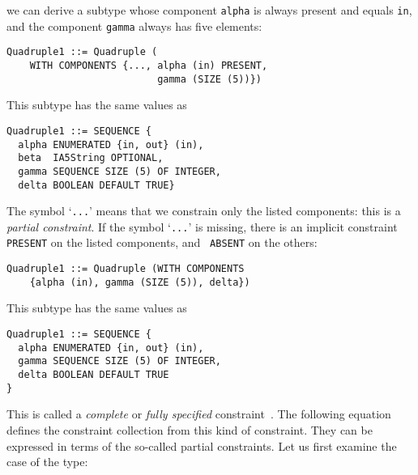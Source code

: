 \noindent
we can derive a subtype whose component \verb+alpha+ is always present
and equals \verb+in+, and the component \verb+gamma+ always has
five elements:
{\small
\begin{verbatim}
Quadruple1 ::= Quadruple (
    WITH COMPONENTS {..., alpha (in) PRESENT, 
                          gamma (SIZE (5))})
\end{verbatim}
}
\noindent
This subtype has the same values as
{\small 
\begin{verbatim}
Quadruple1 ::= SEQUENCE {
  alpha ENUMERATED {in, out} (in),
  beta  IA5String OPTIONAL,
  gamma SEQUENCE SIZE (5) OF INTEGER,
  delta BOOLEAN DEFAULT TRUE}
\end{verbatim}
}
\noindent
The symbol `\verb+...+' means that we constrain only the listed
components: this is a \emph{partial constraint}. If the symbol
`\verb+...+' is missing, there is an implicit constraint
\texttt{\small PRESENT} on the listed components, and \texttt{\small
ABSENT} on the others:
{\small
\begin{verbatim}
Quadruple1 ::= Quadruple (WITH COMPONENTS 
    {alpha (in), gamma (SIZE (5)), delta})
\end{verbatim}
}
\noindent
This subtype has the same values as
{\small 
\begin{verbatim}
Quadruple1 ::= SEQUENCE {
  alpha ENUMERATED {in, out} (in),
  gamma SEQUENCE SIZE (5) OF INTEGER,
  delta BOOLEAN DEFAULT TRUE
}
\end{verbatim}
}

\noindent
This is called a \emph{complete} or \emph{fully specified}
constraint~\cite[\S{47.8.6}]{X.680:2002}. The following equation
defines the constraint collection from this kind of constraint. They
can be expressed in terms of the so-called partial constraints. Let us
first examine the case of the \kwdCHOICE{} type:

\medskip

